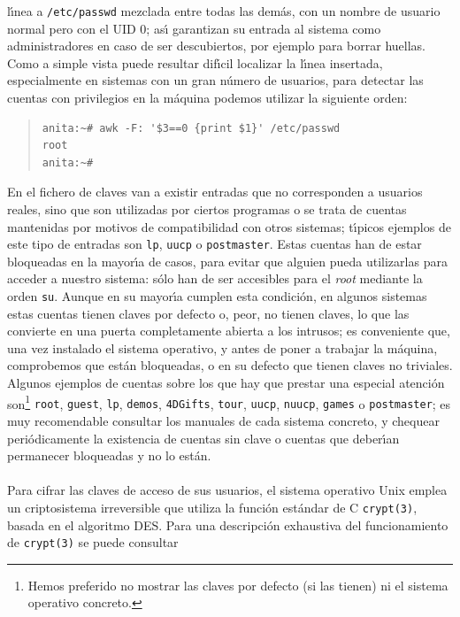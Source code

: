 l\'{\i}nea a {\tt /etc/passwd} mezclada entre todas las dem\'as, con un nombre 
de usuario normal pero con el UID 0; as\'{\i} garantizan su entrada al sistema 
como administradores en caso de ser descubiertos, por ejemplo para borrar 
huellas. Como a simple vista puede resultar dif\'{\i}cil localizar la 
l\'{\i}nea insertada, especialmente en sistemas con un gran n\'umero de 
usuarios, para detectar las cuentas con privilegios en la m\'aquina podemos 
utilizar la siguiente orden:
\begin{quote} 
\begin{verbatim} 
anita:~# awk -F: '$3==0 {print $1}' /etc/passwd
root
anita:~#
\end{verbatim}
\end{quote}\vspace{5pt}
En el fichero de claves van a existir entradas que no corresponden a usuarios
reales, sino que son utilizadas por ciertos programas o se trata de cuentas 
mantenidas por motivos de compatibilidad con otros sistemas; t\'{\i}picos 
ejemplos de este tipo de entradas son {\tt lp}, {\tt uucp} o {\tt postmaster}.
Estas cuentas han de estar bloqueadas en la mayor\'{\i}a de casos, para evitar
que alguien pueda utilizarlas para acceder a nuestro sistema: s\'olo han de
ser accesibles para el {\it root} mediante la orden {\tt su}. Aunque en su 
mayor\'{\i}a cumplen esta condici\'on, en algunos sistemas estas cuentas tienen
claves por defecto o, peor, no tienen claves, lo que las convierte en una 
puerta completamente abierta a los intrusos; es conveniente que, una vez 
instalado el sistema operativo, y antes de poner a trabajar la m\'aquina, 
comprobemos que est\'an bloqueadas, o en su defecto que tienen claves no 
triviales. Algunos ejemplos de cuentas sobre los que hay que prestar una 
especial atenci\'on son\footnote{Hemos preferido no mostrar las claves por 
defecto (si las tienen) ni el sistema operativo concreto.} {\tt root}, 
{\tt guest}, {\tt lp}, {\tt demos}, {\tt 4DGifts}, {\tt tour}, {\tt uucp}, 
{\tt nuucp}, {\tt games} o {\tt postmaster}; es muy recomendable
consultar los manuales de cada sistema concreto, y chequear peri\'odicamente 
la existencia de cuentas sin clave o cuentas que deber\'{\i}an permanecer 
bloqueadas y no lo est\'an.\\  
\\Para cifrar las claves de acceso de sus usuarios, el sistema operativo
Unix emplea un criptosistema irreversible que utiliza la funci\'on est\'andar
de C {\tt crypt(3)}, basada en el algoritmo DES. Para una 
descripci\'on exhaustiva del funcionamiento de {\tt crypt(3)} se puede consultar
